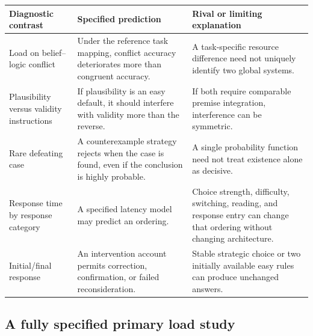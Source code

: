 \begin{center}
\begin{tabular}{p{}p{}p{}}
\toprule
Diagnostic contrast & Specified prediction & Rival or limiting explanation\\
\midrule
Load on belief--logic conflict & Under the reference task mapping,
conflict accuracy deteriorates more than congruent accuracy. & A task-specific
resource difference need not uniquely identify two global systems.\\
Plausibility versus validity instructions & If plausibility is an easy
default, it should interfere with validity more than the reverse. & If both
require comparable premise integration, interference can be symmetric.\\
Rare defeating case & A counterexample strategy rejects when the case
is found, even if the conclusion is highly probable. & A single probability
function need not treat existence alone as decisive.\\
Response time by response category & A specified latency model may
predict an ordering. & Choice strength, difficulty, switching, reading, and
response entry can change that ordering without changing architecture.\\
Initial/final response & An intervention account permits correction,
confirmation, or failed reconsideration. & Stable strategic choice or two
initially available easy rules can produce unchanged answers.\\
\bottomrule
\end{tabular}
\end{center}

\subsection{A fully specified primary load study}

